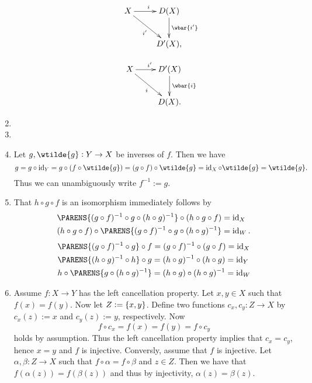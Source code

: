 \begin{enumerate}[label = \textbf{Exercise \arabic*.},wide = 0pt, itemsep=1.5ex]
\begin{enumerate}[label = \textup{(}\alph*\textup{)}]
				\begin{figure}[h!tb]
					\begin{subfigure}{0.3\textwidth}
						\begin{displaymath}
    						\xymatrix{X \ar[r]^i\ar[dr]_{i'} & D(X) \ar[d]^{\wbar{i'}}\\
						 	& D'(X),}
						\end{displaymath}
					\end{subfigure}
					\quad
					\begin{subfigure}{0.3\textwidth}
						\begin{displaymath}
							\xymatrix{X \ar[r]^{i'}\ar[dr]_{i} & D'(X) \ar[d]^{\wbar{i}}\\
						 	& D(X).}
						\end{displaymath}
					\end{subfigure}
				\end{figure}
		\end{enumerate}
	\item 
	\item
	\item Let $g,\wtilde{g} : Y \to X$ be inverses of $f$. Then we have
		\begin{equation*}
			g = g \circ \id_Y = g \circ (f \circ \wtilde{g}) = (g \circ f) \circ \wtilde{g} = \id_X \circ \wtilde{g} = \wtilde{g}.
		\end{equation*}
		Thus we can unambiguously write $f^{-1} := g$.
	\item That $h \circ g \circ f$ is an isomorphism immediately follows by
		\begin{align*}
			& \PARENS{(g \circ f)^{-1} \circ g \circ (h \circ g)^{-1}} \circ (h \circ g \circ f) = \id_X\\
			& (h \circ g \circ f) \circ \PARENS{(g \circ f)^{-1} \circ g \circ (h \circ g)^{-1}} = \id_W.
		\end{align*}
		\begin{align*}
			&\PARENS{(g \circ f)^{-1} \circ g} \circ f = (g \circ f)^{-1} \circ (g \circ f) = \id_X\\
			&\PARENS{(h \circ g)^{-1} \circ h} \circ g = (h \circ g)^{-1} \circ (h \circ g) = \id_Y\\
			&h \circ \PARENS{g \circ (h \circ g)^{-1}} = (h \circ g) \circ (h \circ g)^{-1} = \id_W
		\end{align*}
		\noindent 
	\item Assume $f : X \to Y$ has the left cancellation property. Let $x,y \in X$ such that $f(x) = f(y)$. Now let $Z := \cbr[0]{x,y}$. Define two functions $c_x,c_y : Z \to X$ by $c_x(z) := x$ and $c_y(z) := y$, respectively. Now
		\begin{equation*}
			f \circ c_x = f(x) = f(y) = f \circ c_y
		\end{equation*}
		\noindent holds by assumption. Thus the left cancellation property implies that $c_x = c_y$, hence $x = y$ and $f$ is injective. Conversly, assume that $f$ is injective. Let $\alpha,\beta : Z \to X$ such that $f \circ \alpha = f \circ \beta$ and $z \in Z$. Then we have that $f(\alpha(z)) = f(\beta(z))$ and thus by injectivity, $\alpha(z) = \beta(z)$. 
\end{enumerate}
\printbibliography

